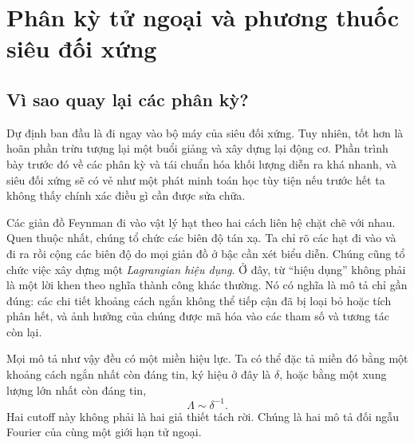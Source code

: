 \chapter{Phân kỳ tử ngoại và phương thuốc siêu đối xứng}


\section{Vì sao quay lại các phân kỳ?}

Dự định ban đầu là đi ngay vào bộ máy của siêu đối xứng. Tuy nhiên, tốt hơn là hoãn phần trừu tượng lại một buổi giảng và xây dựng lại động cơ. Phần trình bày trước đó về các phân kỳ và tái chuẩn hóa khối lượng diễn ra khá nhanh, và siêu đối xứng sẽ có vẻ như một phát minh toán học tùy tiện nếu trước hết ta không thấy chính xác điều gì cần được sửa chữa.

Các giản đồ Feynman đi vào vật lý hạt theo hai cách liên hệ chặt chẽ với nhau. Quen thuộc nhất, chúng tổ chức các biên độ tán xạ. Ta chỉ rõ các hạt đi vào và đi ra rồi cộng các biên độ do mọi giản đồ ở bậc cần xét biểu diễn. Chúng cũng tổ chức việc xây dựng một \emph{Lagrangian hiệu dụng}. Ở đây, từ ``hiệu dụng'' không phải là một lời khen theo nghĩa thành công khác thường. Nó có nghĩa là mô tả chỉ gần đúng: các chi tiết khoảng cách ngắn không thể tiếp cận đã bị loại bỏ hoặc tích phân hết, và ảnh hưởng của chúng được mã hóa vào các tham số và tương tác còn lại.

Mọi mô tả như vậy đều có một miền hiệu lực. Ta có thể đặc tả miền đó bằng một khoảng cách ngắn nhất còn đáng tin, ký hiệu ở đây là \(\delta\), hoặc bằng một xung lượng lớn nhất còn đáng tin,
\begin{equation}
\Lambda\sim \delta^{-1}.
\end{equation}
Hai cutoff này không phải là hai giả thiết tách rời. Chúng là hai mô tả đối ngẫu Fourier của cùng một giới hạn tử ngoại.


